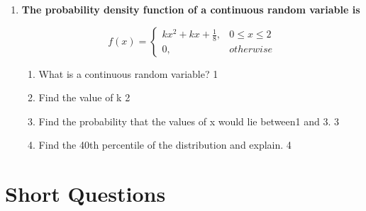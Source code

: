 \documentclass[a4paper,oneside, margin=1.4in]{book}
\begin{document}
\begin{enumerate}
 \item
  \textbf{The probability density function of a continuous random variable is}

$$
  f(x) =
\begin{cases}
kx^2+kx+ \frac 18,  & 0 \le x \le 2 \\
0, & otherwise
\end{cases}
$$

  \begin{enumerate}
    \item
	What is a continuous random variable? \hfill 1
    \item
    	Find the value of k \hfill 2
    \item
    	Find the probability that the values of x would lie between1 and 3. \hfill 3
     \item
     	Find the 40th percentile of the distribution and explain.  \hfill 4
  \end{enumerate}
  \end{enumerate}

\section{Short Questions}
\end{document}
